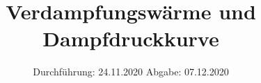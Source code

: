 

\subject{V203}
\title{Verdampfungswärme und Dampfdruckkurve}
\date{%
  Durchführung: 24.11.2020
  \hspace{3em}
  Abgabe: 07.12.2020
}



\maketitle
\thispagestyle{empty}
\tableofcontents
\newpage







\nocite{Anleitung}
\nocite{Verdampfungswärme}
\printbibliography{}


